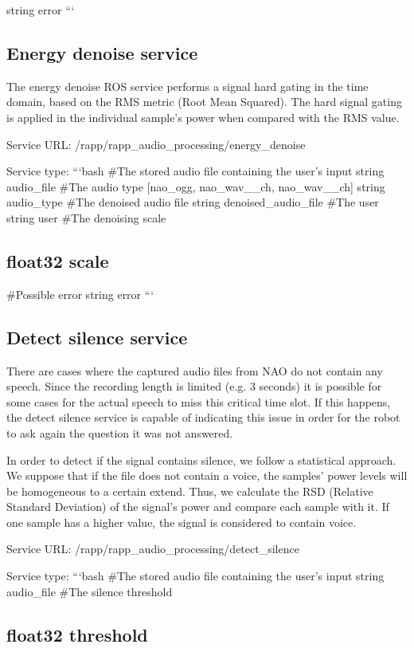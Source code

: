 string error ```

\subsection*{Energy denoise service}

The energy denoise R\-O\-S service performs a signal hard gating in the time domain, based on the R\-M\-S metric (Root Mean Squared). The hard signal gating is applied in the individual sample’s power when compared with the R\-M\-S value.

Service U\-R\-L\-: {\ttfamily /rapp/rapp\-\_\-audio\-\_\-processing/energy\-\_\-denoise}

Service type\-: ```bash \#\-The stored audio file containing the user’s input string audio\-\_\-file \#\-The audio type \mbox{[}nao\-\_\-ogg, nao\-\_\-wav\-\_\-\_\-ch, nao\-\_\-wav\-\_\-\_\-ch\mbox{]} string audio\-\_\-type \#\-The denoised audio file string denoised\-\_\-audio\-\_\-file \#\-The user string user \#\-The denoising scale \subsection*{float32 scale }

\#\-Possible error string error ``` \subsection*{Detect silence service}

There are cases where the captured audio files from N\-A\-O do not contain any speech. Since the recording length is limited (e.\-g. 3 seconds) it is possible for some cases for the actual speech to miss this critical time slot. If this happens, the detect silence service is capable of indicating this issue in order for the robot to ask again the question it was not answered.

In order to detect if the signal contains silence, we follow a statistical approach. We suppose that if the file does not contain a voice, the samples’ power levels will be homogeneous to a certain extend. Thus, we calculate the R\-S\-D (Relative Standard Deviation) of the signal’s power and compare each sample with it. If one sample has a higher value, the signal is considered to contain voice.

Service U\-R\-L\-: {\ttfamily /rapp/rapp\-\_\-audio\-\_\-processing/detect\-\_\-silence}

Service type\-: ```bash \#\-The stored audio file containing the user’s input string audio\-\_\-file \#\-The silence threshold \subsection*{float32 threshold }

